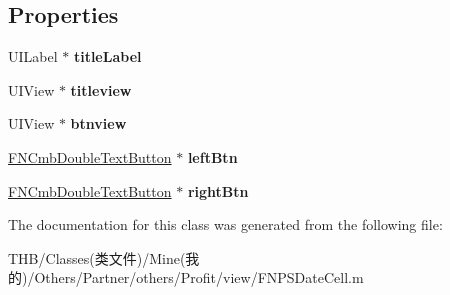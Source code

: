 \subsection*{Properties}
\begin{DoxyCompactItemize}
\item 
\mbox{\label{interface_f_n_p_s_date_element_view_a7b3e63a0b1f476097745866691f4ae44}} 
U\+I\+Label $\ast$ {\bfseries title\+Label}
\item 
\mbox{\label{interface_f_n_p_s_date_element_view_a769768ea9bf2bfd32c74a2cbf18c501a}} 
U\+I\+View $\ast$ {\bfseries titleview}
\item 
\mbox{\label{interface_f_n_p_s_date_element_view_a15c49f0d59643c6e23ceb479a29c8f54}} 
U\+I\+View $\ast$ {\bfseries btnview}
\item 
\mbox{\label{interface_f_n_p_s_date_element_view_a82c4bded79fec139505f56a4272e3977}} 
\mbox{\hyperlink{interface_f_n_cmb_double_text_button}{F\+N\+Cmb\+Double\+Text\+Button}} $\ast$ {\bfseries left\+Btn}
\item 
\mbox{\label{interface_f_n_p_s_date_element_view_a85a1822ac2a88c99ec38aea15915e559}} 
\mbox{\hyperlink{interface_f_n_cmb_double_text_button}{F\+N\+Cmb\+Double\+Text\+Button}} $\ast$ {\bfseries right\+Btn}
\end{DoxyCompactItemize}


The documentation for this class was generated from the following file\+:\begin{DoxyCompactItemize}
\item 
T\+H\+B/\+Classes(类文件)/\+Mine(我的)/\+Others/\+Partner/others/\+Profit/view/F\+N\+P\+S\+Date\+Cell.\+m\end{DoxyCompactItemize}
